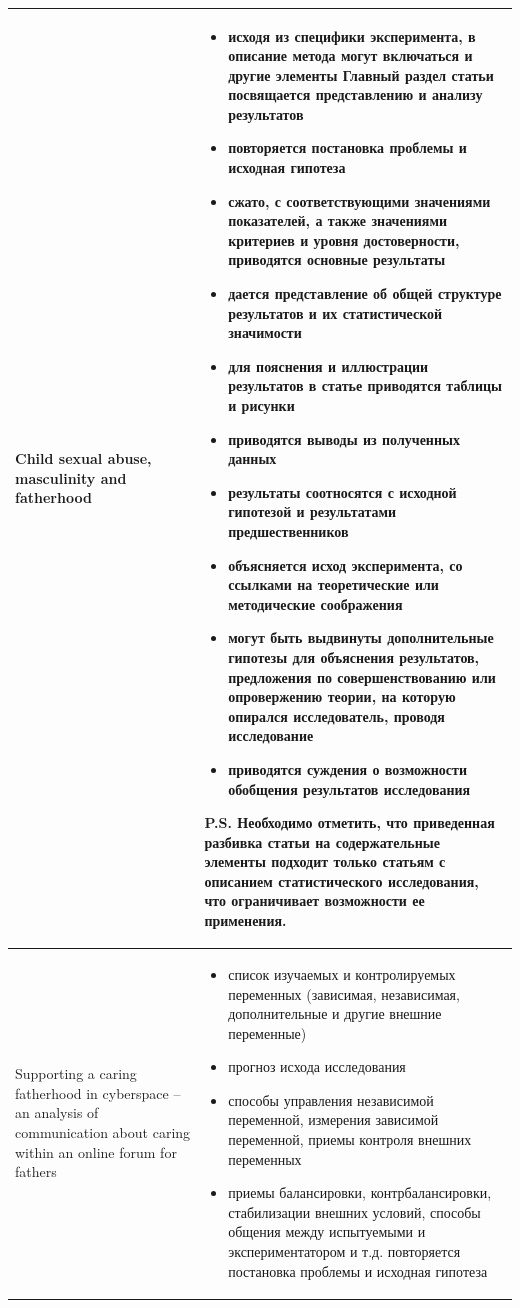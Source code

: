 \documentclass{../../common/thesisbyxetex}
\begin{document}
\begin{longtable}[t]{|P{0.25\textwidth}|P{0.65\textwidth}|}
Child sexual abuse, masculinity and fatherhood &
\begin{itemize}
\item исходя из специфики эксперимента, в описание метода могут включаться и другие элементы
Главный раздел статьи посвящается представлению и анализу результатов
\item повторяется постановка проблемы и исходная гипотеза
\item сжато, с соответствующими значениями показателей, а также значениями критериев и уровня достоверности, приводятся
основные результаты
\item дается представление об общей структуре результатов и их статистической значимости
\item для пояснения и иллюстрации результатов в статье приводятся таблицы и рисунки
\item приводятся выводы из полученных данных
\item результаты соотносятся с исходной гипотезой и результатами предшественников
\item объясняется исход эксперимента, со ссылками на теоретические или методические соображения
\item могут быть выдвинуты дополнительные гипотезы для объяснения результатов, предложения по совершенствованию или
опровержению теории, на которую опирался исследователь, проводя исследование
\item приводятся суждения о возможности обобщения результатов исследования
\end{itemize}
P.S. Необходимо отметить, что приведенная разбивка статьи на содержательные элементы подходит только статьям с
описанием
статистического исследования, что ограничивает возможности ее применения.
\\ \hline

Supporting a caring fatherhood in cyberspace – an analysis of communication about caring within an online forum for
fathers &
\begin{itemize}
\item список изучаемых и контролируемых переменных (зависимая, независимая, дополнительные и другие внешние переменные)
\item прогноз исхода исследования
\item способы управления независимой переменной, измерения зависимой переменной, приемы контроля внешних переменных
\item приемы балансировки, контрбалансировки, стабилизации внешних условий, способы общения между испытуемыми и
экспериментатором и т.д. повторяется постановка проблемы и исходная гипотеза
\end{itemize}


\end{longtable}
\end{document}
